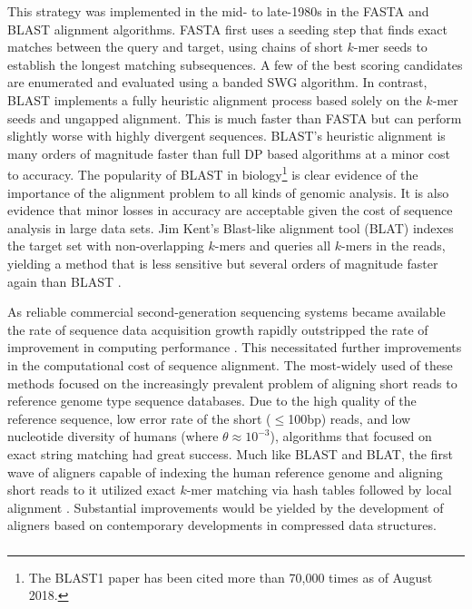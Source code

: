 \documentclass[a4paper,12pt,numbered,oneside]{Classes/PhDThesisPSnPDF}
\providecommand{\DIFaddtex}[1]{{\protect\color{blue}\uwave{#1}}} %
\providecommand{\DIFaddbegin}{} %
\providecommand{\DIFadd}[1]{\texorpdfstring{\DIFaddtex{#1}}{#1}} %
\begin{document}
This strategy was implemented in the mid- to late-1980s in the FASTA \cite{pearson1988improved} and BLAST \cite{altschul1990basic} alignment algorithms.
FASTA first uses a seeding step that finds exact matches between the query and target, using chains of short $k$-mer seeds to establish the longest matching subsequences.
A few of the best scoring candidates are enumerated and evaluated using a banded SWG algorithm.
In contrast, BLAST implements a fully heuristic alignment process based solely on the $k$-mer seeds and ungapped alignment.
This is much faster than FASTA but can perform slightly worse with highly divergent sequences.
BLAST's heuristic alignment is many orders of magnitude faster than full DP based algorithms at a minor cost to accuracy.
The popularity of BLAST in biology\footnote{The BLAST1 paper has been cited more than 70,000 times as of August 2018.} is clear evidence of the importance of the alignment problem to all kinds of genomic analysis.
It is also evidence that minor losses in accuracy are acceptable given the cost of sequence analysis in large data sets.
Jim Kent's Blast-like alignment tool (BLAT) indexes the target set with non-overlapping $k$-mers and queries all $k$-mers in the reads, yielding a method that is less sensitive but several orders of magnitude faster again than BLAST \cite{kent2002blat}.

As reliable commercial second-generation sequencing systems became available the rate of sequence data acquisition growth rapidly outstripped the rate of improvement in computing performance \cite{leinonen2010sequence,kodama2011sequence}.
This necessitated further improvements in the computational cost of sequence alignment.
The most-widely used of these methods focused on the increasingly prevalent problem of aligning short reads to reference genome type sequence databases.
Due to the high quality of the reference sequence, low error rate of the short ($\leq$100bp) reads, and low nucleotide diversity of humans (where $\theta \approx 10^{-3}$), algorithms that focused on exact string matching had great success.
Much like BLAST and BLAT, the first wave of aligners capable of indexing the human reference genome and aligning short reads to it utilized exact $k$-mer matching via hash tables followed by local alignment \cite{li2008soap,lee2014mosaik,li2008mapping}.
Substantial improvements would be yielded by the development of aligners based on contemporary developments in compressed data structures.

\DIFaddbegin \subsubsection{\DIFadd{Compressed full text indexes}}
\label{sec:compressed_full_text_indexes}
\end{document}
